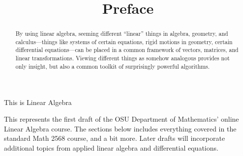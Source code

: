 \documentclass{ximera}
\title{Preface}
\begin{document}
\begin{abstract}
  By using linear algebra, seeming different ``linear'' things in
  algebra, geometry, and calculus—things like systems of certain
  equations, rigid motions in geometry, certain differential
  equations—can be placed in a common framework of vectors, matrices,
  and linear transformations.  Viewing different things as somehow
  analogous provides not only insight, but also a common toolkit of
  surprisingly powerful algorithms.
\end{abstract}
\maketitle

\begin{center}
\Huge This is Linear Algebra
\end{center}

This represents the first draft of the OSU Department of Mathematics'
online Linear Algebra course. The sections below includes everything
covered in the standard Math 2568 course, and a bit more. Later drafts
will incorporate additional topics from applied linear algebra and
differential equations.
\end{document}
